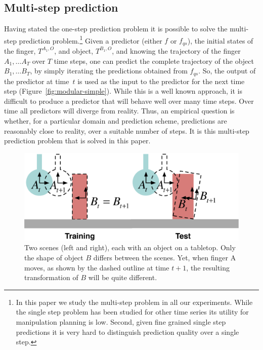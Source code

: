 \subsection{Multi-step prediction} Having stated the one-step prediction problem it is possible to solve the multi-step prediction problem.\footnote{In this paper we study the multi-step problem in all our experiments. While the single step problem has been studied for other time series its utility for manipulation planning is low. Second, given fine grained single step predictions it is very hard to distinguish prediction quality over a single step.} Given a predictor (either $f$ or
$f_{qs}$), the initial states of the finger, $T^{A_{1}, O}$, and object, 
$T^{B_{1}, O}$, and knowing the trajectory of the finger $A_{1},
\ldots A_{T}$ over $T$ time steps, one can predict the complete
trajectory of the object $B_{1}, \ldots B_{T}$, by simply iterating
the predictions obtained from $f_{qs}$.  So, the output of the
predictor at time~$t$ is used as the input to the predictor for the
next time step (Figure~\ref{fig:modular-simple}). While this is a well known approach, it is difficult to produce a predictor that will behave well over many time steps. Over time all predictors will diverge from reality. Thus, an empirical question is whether, for a particular domain and prediction scheme, predictions are reasonably close to reality, over a suitable number of steps. It is this multi-step prediction problem that is solved in this paper.
\begin{figure}[t]
\centerline{\includegraphics[width=\columnwidth]{shapes-colour}}
\caption[Shapes]{Two scenes (left and right),
each with an object on a tabletop. Only the shape of object $B$ differs between the scenes. Yet, when finger A moves, as shown by the dashed outline at time $t+1$, the resulting transformation of $B$ will be quite different.}
\label{fig:Learning.shapes}
\end{figure}
